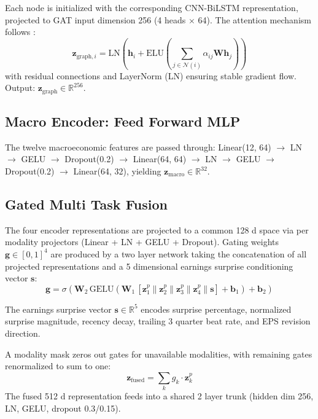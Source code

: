 \documentclass[10pt, twocolumn, a4paper]{article}
\begin{document}
Each node is initialized with the corresponding CNN{-}BiLSTM representation,
projected to GAT input dimension 256 (4 heads $\times$ 64). The attention
mechanism follows \citet{velivckovic2018graph}:
\begin{equation}
    \mathbf{z}_{\text{graph},i} = \text{LN}\!\left(\mathbf{h}_i +
    \text{ELU}\!\left( \sum_{j \in \mathcal{N}(i)} \alpha_{ij}
    \mathbf{W} \mathbf{h}_j \right)\right)
\end{equation}
with residual connections and LayerNorm (LN) ensuring stable gradient flow.
Output: $\mathbf{z}_{\text{graph}} \in \mathbb{R}^{256}$.

\subsection{Macro Encoder: Feed Forward MLP}

The twelve macroeconomic features are passed through:
Linear(12, 64) $\to$ LN $\to$ GELU $\to$ Dropout(0.2) $\to$
Linear(64, 64) $\to$ LN $\to$ GELU $\to$ Dropout(0.2) $\to$
Linear(64, 32), yielding $\mathbf{z}_{\text{macro}} \in \mathbb{R}^{32}$.

\subsection{Gated Multi Task Fusion}

The four encoder representations are projected to a common 128 d space via
per modality projectors (Linear + LN + GELU + Dropout). Gating weights
$\mathbf{g} \in [0,1]^4$ are produced by a two layer network taking the
concatenation of all projected representations and a 5 dimensional earnings
surprise conditioning vector $\mathbf{s}$:
\begin{equation}
    \mathbf{g} = \sigma\!\left( \mathbf{W}_2 \,
    \text{GELU}\!\left(\mathbf{W}_1 \,[\mathbf{z}_1^p
    \| \mathbf{z}_2^p \|
    \mathbf{z}_3^p \|
    \mathbf{z}_4^p \| \mathbf{s}] +
    \mathbf{b}_1\right) + \mathbf{b}_2 \right)
\end{equation}

The earnings surprise vector $\mathbf{s} \in \mathbb{R}^5$ encodes surprise
percentage, normalized surprise magnitude, recency decay, trailing 3 quarter
beat rate, and EPS revision direction.

A modality mask zeros out gates for unavailable modalities, with remaining
gates renormalized to sum to one:
\begin{equation}
    \mathbf{z}_{\text{fused}} = \sum_{k} g_k \cdot \mathbf{z}_k^p
\end{equation}
The fused 512 d representation feeds into a shared 2 layer trunk (hidden
dim 256, LN, GELU, dropout 0.3/0.15).
\end{document}
